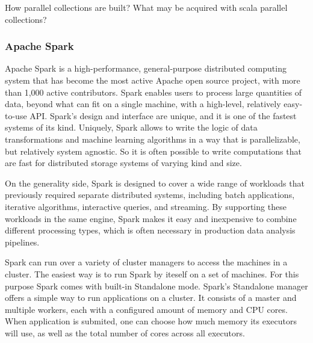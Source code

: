  How parallel collections are built?
 What may be acquired with scala parallel collections?


\subsubsection{Apache Spark}

Apache Spark is a high-performance, general-purpose distributed computing system that has become the most active Apache open source project, with more than 1,000 active contributors. Spark enables users to process large quantities of data, beyond what can fit on a single machine, with a high-level, relatively easy-to-use API. Spark’s design and interface are unique, and it is one of the fastest systems of its kind. Uniquely, Spark allows to write the logic of data transformations and machine learning algorithms in a way that is parallelizable, but relatively system agnostic. So it is often possible to write computations that are fast for distributed storage systems of varying kind and size.

On the generality side, Spark is designed to cover a wide range of workloads that previously required separate distributed systems, including batch applications, iterative algorithms, interactive queries, and streaming. By supporting these workloads in the same engine, Spark makes it easy and inexpensive to combine different processing types, which is often necessary in production data analysis pipelines.\cite{learning_spark}

Spark can run over a variety of cluster managers to access the machines in a cluster. The easiest way is to run Spark by iteself on a set of machines. For this purpose Spark comes with built-in Standalone mode. Spark’s Standalone manager offers a simple way to run applications on a cluster. It consists of a master and multiple workers, each with a configured amount of memory and CPU cores. When application is submited, one can choose how much memory its executors will use, as well as the total number of cores across all executors.

